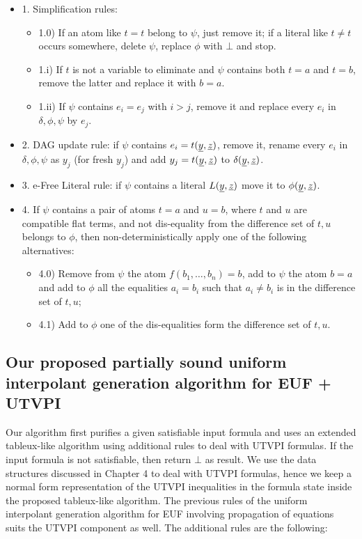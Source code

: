\begin{itemize}
  \item[] 1. Simplification rules:
    \begin{itemize}
      \item 1.0) If an atom like $t = t$ belong to $\psi$, just remove it; if a
      literal like $t \neq t$ occurs somewhere, delete $\psi$, replace $\phi$
      with $\bot$ and stop.
    \item 1.i) If $t$ is not a variable to eliminate and $\psi$ contains
    both $t = a$ and $t = b$, remove the latter and replace it with $b = a$.
  \item 1.ii) If $\psi$ contains $e_i = e_j$ with $i > j$, remove it
  and replace every $e_i$ in $\delta, \phi, \psi$ by $e_j$.
    \end{itemize}
  \item[] 2. DAG update rule: if $\psi$ contains $e_i = t(\underline{y}, \underline{z})$, remove
    it, rename every $e_i$ in $\delta, \phi, \psi$ as $y_j$ (for fresh $y_j$)
    and add $y_j = t(\underline{y}, \underline{z})$ to $\delta(\underline{y}, \underline{z})$.
  \item[] 3.  e-Free Literal rule: if $\psi$ contains a literal $L(\underline{y}, \underline{z})$
    move it to $\phi(\underline{y}, \underline{z})$.
  \item[] 4.  If $\psi$ contains a pair of atoms $t = a$ and $u = b$, where
    $t$ and $u$ are compatible flat terms, and not dis-equality from the difference
    set of $t, u$ belongs to $\phi$, then non-deterministically apply one of the
    following alternatives:
    \begin{itemize}
      \item 4.0) Remove from $\psi$ the atom $f(b_1, \dots, b_n) = b$, add
      to $\psi$ the atom $b = a$ and add to $\phi$ all the equalities
      $a_i = b_i$ such that $a_i \neq b_i$ is in the difference set of $t, u$;
      \item 4.1) Add to $\phi$ one of the dis-equalities form the difference
      set of $t, u$.
    \end{itemize}
\end{itemize}

\subsection{Our proposed partially sound 
uniform interpolant generation algorithm 
for EUF + UTVPI}

Our algorithm first purifies a given satisfiable input formula and 
uses an extended tableux-like algorithm
using additional rules to deal with UTVPI formulas. 
If the input formula is not satisfiable, 
then return $\bot$ as result. 
We use the data structures discussed in Chapter 4 to deal with UTVPI formulas,
hence we keep a normal form representation of the UTVPI inequalities in the
formula state inside the proposed tableux-like algorithm.
The previous rules of the uniform interpolant generation algorithm
for EUF involving propagation of equations suits the UTVPI component as well. 
The additional rules are the following:

